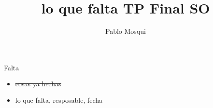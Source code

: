 \documentclass[a4paper,10pt]{report}%
\title{lo que falta TP Final SO}
\author{Pablo Mosqui}
\begin{document}
\begin{LARGE}Falta\end{LARGE}

\begin{itemize}
\item \sout{ cosas ya hechas}
\item  lo que falta, resposable, fecha
\end{itemize} 
\end{document}
